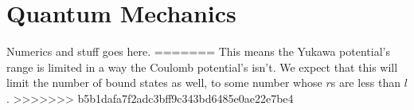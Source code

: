 \documentclass[12pt,twoside]{reedthesis}
\begin{document}
\section{Quantum Mechanics}
Numerics and stuff goes here.
=======
This means the Yukawa potential's range is limited in a way the Coulomb potential's isn't. We expect that this will limit the number of bound states as well, to some number whose $r$s are less than $l$.
>>>>>>> b5b1dafa7f2adc3bff9c343bd6485e0ae22e7be4
%
%
%	
%
%
%
%
\backmatter %
%

 
  
%
   \nocite{*}
   

\end{document}

